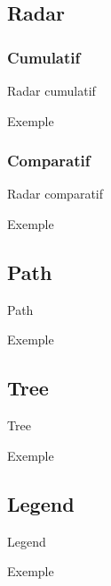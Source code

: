 \documentclass{beamer}
\begin{document}
\subsection{Radar}
\subsubsection{Cumulatif}
\begin{frame}{Radar cumulatif}
\end{frame}

\begin{frame}{Exemple}
\end{frame}

\subsubsection{Comparatif}
\begin{frame}{Radar comparatif}
\end{frame}

\begin{frame}{Exemple}
\end{frame}

\subsection{Path}
\begin{frame}{Path}
\end{frame}

\begin{frame}{Exemple}
\end{frame}

\subsection{Tree}
\begin{frame}{Tree}
\end{frame}

\begin{frame}{Exemple}
\end{frame}

\subsection{Legend}
\begin{frame}{Legend}
\end{frame}

\begin{frame}{Exemple}
\end{frame}
\end{document}
